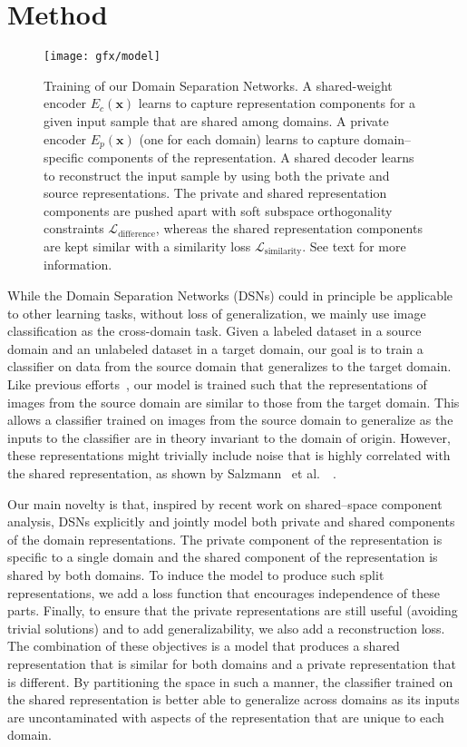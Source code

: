 \documentclass{article}
\newcommand{\bs}[1]{\boldsymbol{\mathbf{#1}}}
\newcommand{\etal}{~et al.~}
\begin{document}
\section{Method}
\vspace{-4mm}
\label{sec:model}
\begin{figure}[tb]
     \centering
     \texttt{[image: gfx/model]}
     \caption{Training of our Domain Separation Networks. A shared-weight encoder $E_c(\bs x)$ learns to capture representation components for a given input sample that are shared among domains. A private encoder $E_p(\bs x)$ (one for each domain) learns to capture domain--specific components of the representation. A shared decoder learns to reconstruct the input sample by using both the private and source representations. The private and shared representation components are pushed apart with soft subspace orthogonality constraints $\mathcal {L}_\mathrm{difference}$, whereas the shared representation components are kept similar with a similarity loss $\mathcal {L}_\mathrm{similarity}$. See text for more information.}
     \label{fig:model}
\end{figure}
While the Domain Separation Networks (DSNs) could in principle be applicable to other learning tasks, without loss of generalization, we mainly use
image classification as the cross-domain task. Given a labeled dataset in a source domain and
an unlabeled dataset in a target domain, our goal is to train a classifier on data
from the source domain that generalizes to the target domain. Like previous efforts~\cite{ganin2014unsupervised,ganin2016domain},
our model is trained such that the representations of images from the source
domain are similar to those from the target domain. This allows
a classifier trained on images from the source domain to generalize
as the inputs to the classifier are in theory invariant to the domain of origin. However, these representations might trivially include noise that is highly correlated with the shared
representation, as shown by Salzmann \etal ~\cite{salzmann2010factorized}.

Our main novelty is that, inspired by recent
work \cite{jia2010factorized,salzmann2010factorized,virtanen2011bayesian} on 
shared--space component analysis, DSNs explicitly and jointly model both private and shared components of the domain representations. The private component
of the representation is specific to a single domain and the shared component
of the representation is shared by both domains. To induce the model to 
produce such split representations, we add a loss function that encourages
independence of these parts. Finally, to ensure that the private
representations are still useful (avoiding trivial solutions) and to add
generalizability, we also add a reconstruction loss.
The combination of these objectives is a model that produces a shared
representation that is similar for both domains and a private representation that
is different. By partitioning the space in such a manner, the classifier trained on
the shared representation is better able to generalize across domains as its inputs
are uncontaminated with aspects of the representation that are unique to each domain.
\end{document}
